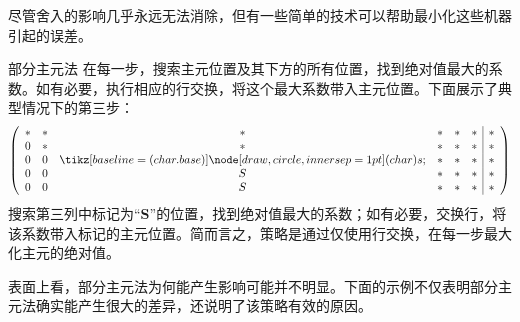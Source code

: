 尽管舍入的影响几乎永远无法消除，但有一些简单的技术可以帮助最小化这些机器引起的误差。

\begin{bluebox}{部分主元法}
在每一步，搜索主元位置及其下方的所有位置，找到绝对值最大的系数。如有必要，执行相应的行交换，将这个最大系数带入主元位置。下面展示了典型情况下的第三步：
$$
\left(\begin{array}{cccccc|c} 
* & * & * & * & * & * & * \\
0 & * & * & * & * & * & * \\
0 & 0 & \circlednum{s} & * & * & * & * \\
0 & 0 & S & * & * & * & * \\
0 & 0 & S & * & * & * & *
\end{array}\right)
$$
搜索第三列中标记为“\textbf{S}”的位置，找到绝对值最大的系数；如有必要，交换行，将该系数带入标记的主元位置。简而言之，策略是通过仅使用行交换，在每一步最大化主元的绝对值。


\end{bluebox}
表面上看，部分主元法为何能产生影响可能并不明显。下面的示例不仅表明部分主元法确实能产生很大的差异，还说明了该策略有效的原因。

